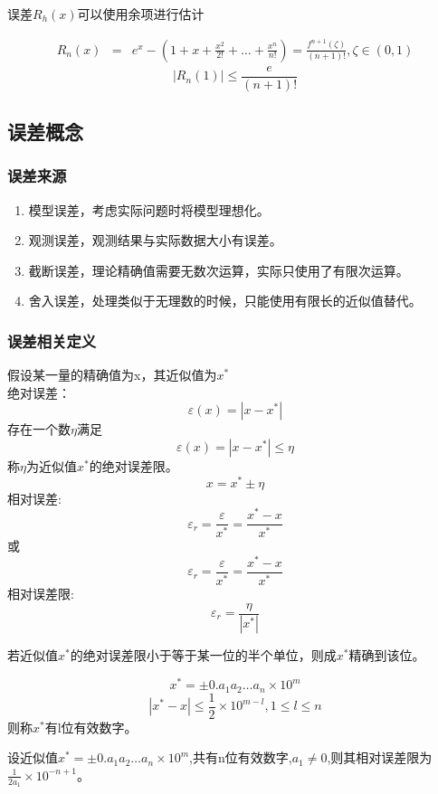 \documentclass[12pt]{report}
\numberwithin{equation}{section}
\begin{document}
	误差$R_h(x)$可以使用余项进行估计  
	
	\begin{equation}
		\begin{aligned}
			R_n(x) &=& e^x - \left(1 + x + \frac{x^2}{2!} + \ldots + \frac{x^n}{n!}\right) = \frac{f^{n+1}(\zeta)}{(n+1)!}, \zeta \in \left(0, 1\right)
		\end{aligned}
	\end{equation}
	$$
	|R_n(1)| \leq \frac{e}{(n+1)!} 
	$$

	\subsection{误差概念}

	\subsubsection{误差来源}
	\begin{enumerate}
        \item 模型误差，考虑实际问题时将模型理想化。
        \item 观测误差，观测结果与实际数据大小有误差。
        \item 截断误差，理论精确值需要无数次运算，实际只使用了有限次运算。
        \item 舍入误差，处理类似于无理数的时候，只能使用有限长的近似值替代。
	\end{enumerate}

	\subsubsection{误差相关定义}
	假设某一量的精确值为x，其近似值为$x^*$  \\
	绝对误差：  
	$$
	\varepsilon (x) = |x - x^*|
	$$
	存在一个数$\eta$满足
	$$
	\varepsilon (x) = |x - x^*| \leq \eta
	$$
	称$\eta$为近似值$x^*$的绝对误差限。
	$$
	x = x^* \pm \eta
	$$
	相对误差:
	$$
	\varepsilon_r = \frac{\varepsilon}{x^*} = \frac{x^* - x}{x^*}
	$$
	或
	$$
	\varepsilon_r = \frac{\varepsilon}{x^*} = \frac{x^* - x}{x^*}
	$$
	相对误差限:
	$$
	\varepsilon_r = \frac{\eta}{|x^*|}
	$$  

	若近似值$x^*$的绝对误差限小于等于某一位的半个单位，则成$x^*$精确到该位。
	
	$$
	x^* = \pm 0.a_1 a_2 \ldots a_n \times 10^m
	$$
	$$
	|x^* - x| \leq \frac{1}{2} \times 10^{m-l}, 1\leq l \leq n
	$$
	则称$x^*$有l位有效数字。  

	设近似值$x^* = \pm 0.a_1 a_2 \ldots a_n \times 10^m$,共有n位有效数字,$a_1 \neq 0$,则其相对误差限为$\frac{1}{2a_1} \times 10^{-n+1}$。  
\end{document}
